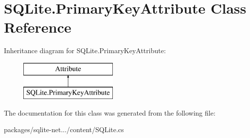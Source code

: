 \hypertarget{classSQLite_1_1PrimaryKeyAttribute}{}\section{S\+Q\+Lite.\+Primary\+Key\+Attribute Class Reference}
\label{classSQLite_1_1PrimaryKeyAttribute}
Inheritance diagram for S\+Q\+Lite.\+Primary\+Key\+Attribute\+:\begin{figure}[H]
\begin{center}
\leavevmode
\includegraphics[height=2.000000cm]{classSQLite_1_1PrimaryKeyAttribute}
\end{center}
\end{figure}


The documentation for this class was generated from the following file\+:\begin{DoxyCompactItemize}
\item 
packages/sqlite-\/net.../content/S\+Q\+Lite.\+cs\end{DoxyCompactItemize}

